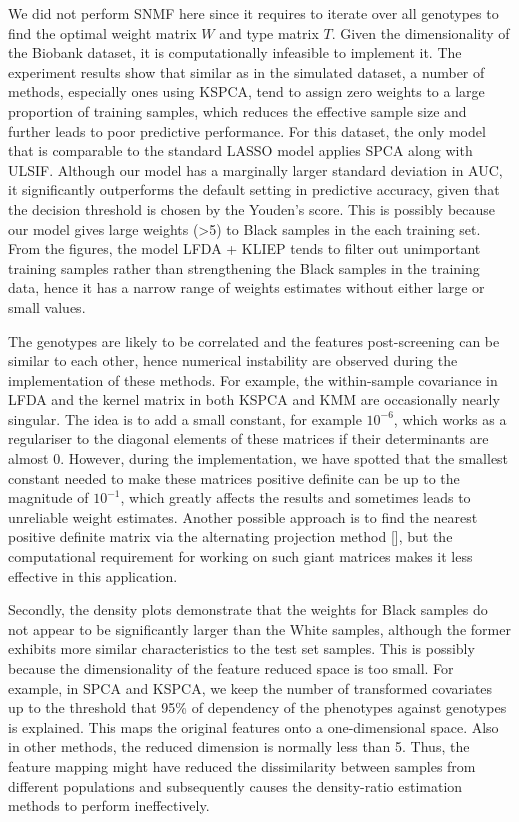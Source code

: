 \documentclass[a4paper,12pt]{article}
\begin{document}
We did not perform SNMF here since it requires to iterate over all genotypes to find the optimal weight matrix $W$ and type matrix $T$. Given the dimensionality of the Biobank dataset, it is computationally infeasible to implement it. The experiment results show that similar as in the simulated dataset, a number of methods, especially ones using KSPCA, tend to assign zero weights to a large proportion of training samples, which reduces the effective sample size and further leads to poor predictive performance. For this dataset, the only model that is comparable to the standard LASSO model applies SPCA along with ULSIF.  Although our model has a marginally larger standard deviation in AUC, it significantly outperforms the default setting in predictive accuracy, given that the decision threshold is chosen by the Youden's score. This is possibly because our model gives large weights (>5) to Black samples in the each training set. From the figures, the model LFDA + KLIEP tends to filter out unimportant training samples rather than strengthening the Black samples in the training data, hence it has a narrow range of weights estimates without either large or small values.

The genotypes are likely to be correlated and the features post-screening can be similar to each other, hence numerical instability are observed during the implementation of these methods. For example, the within-sample covariance in LFDA and the kernel matrix in both KSPCA and KMM are occasionally nearly singular. The idea is to add a small constant, for example $10^{-6}$, which works as a regulariser to the diagonal elements of these matrices if their determinants are almost 0. However, during the implementation, we have spotted that the smallest constant needed to make these matrices positive definite can be up to the magnitude of $10^{-1}$, which greatly affects the results and sometimes leads to unreliable weight estimates. Another possible approach is to find the nearest positive definite matrix via the alternating projection method [\cite{higham2002computing}], but the computational requirement for working on such giant matrices makes it less effective in this application.

Secondly, the density plots demonstrate that the weights for Black samples do not appear to be significantly larger than the White samples, although the former exhibits more similar characteristics to the test set samples. This is possibly because the dimensionality of the feature reduced space is too small. For example, in SPCA and KSPCA, we keep the number of transformed covariates up to the threshold that 95\% of dependency of the phenotypes against genotypes is explained. This maps the original features onto a one-dimensional space. Also in other methods, the reduced dimension is normally less than 5. Thus, the feature mapping might have reduced the dissimilarity between samples from different populations and subsequently causes the density-ratio estimation methods to perform ineffectively. 
\end{document}
